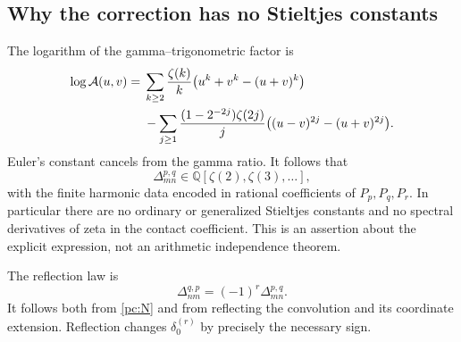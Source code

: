 \documentclass[11pt,a4paper]{article}
\numberwithin{equation}{section}
\theoremstyle{definition}
\newcommand{\Q}{\mathbb Q}
\newcommand{\Af}{\mathcal A}
\begin{document}
\subsection{Why the correction has no Stieltjes constants}
The logarithm of the gamma--trigonometric factor is
\begin{align}\label{pc:logA}
 \log\Af(u,v)={}&\sum_{k\ge2}\frac{\zeta(k)}k
               \bigl(u^k+v^k-(u+v)^k\bigr)\notag\\
 &-\sum_{j\ge1}\frac{(1-2^{-2j})\zeta(2j)}j
               \bigl((u-v)^{2j}-(u+v)^{2j}\bigr).
\end{align}
Euler's constant cancels from the gamma ratio. It follows that
\[
 \Delta_{mn}^{p,q}\in\Q[\zeta(2),\zeta(3),\ldots],
\]
with the finite harmonic data encoded in rational coefficients of $P_p,P_q,P_r$. In particular there are no ordinary or generalized Stieltjes constants and no spectral derivatives of zeta in the contact coefficient. This is an assertion about the explicit expression, not an arithmetic independence theorem.

The reflection law is
\begin{equation}\label{pc:reflection}
 \Delta_{nm}^{q,p}=(-1)^r\Delta_{mn}^{p,q}.
\end{equation}
It follows both from \eqref{pc:N} and from reflecting the convolution and its coordinate extension. Reflection changes $\delta_0^{(r)}$ by precisely the necessary sign.
\end{document}
